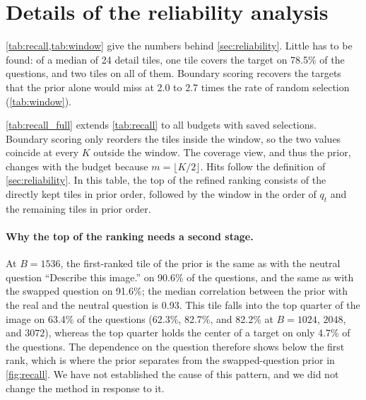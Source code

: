 \section{Details of the reliability analysis}
\label{sec:reliability_supp}





\cref{tab:recall,tab:window} give the numbers behind \cref{sec:reliability}. Little has to be found: of a median of
24 detail tiles, one tile covers the target on 78.5\% of the questions, and two tiles on all of them. Boundary scoring
recovers the targets that the prior alone would miss at 2.0 to 2.7 times the rate of random selection
(\cref{tab:window}).

\cref{tab:recall_full} extends \cref{tab:recall} to all budgets with saved selections. Boundary scoring only
reorders the tiles inside the window, so the two values coincide at every $K$ outside the window. The coverage
view, and thus the prior, changes with the budget because $m=\lfloor K/2\rfloor$. Hits follow the definition of
\cref{sec:reliability}. In this table, the top of the refined ranking consists of the directly kept tiles in
prior order, followed by the window in the order of $q_t$ and the remaining tiles in prior order.

\paragraph{Why the top of the ranking needs a second stage.}
At $B=1536$, the first-ranked tile of the prior is the same as with the neutral question ``Describe this
image.'' on 90.6\% of the questions, and the same as with the swapped question on 91.6\%; the median
correlation between the prior with the real and the neutral question is 0.93. This tile falls into the top
quarter of the image on 63.4\% of the questions (62.3\%, 82.7\%, and 82.2\% at $B=1024$, $2048$, and $3072$), whereas
the top quarter holds the center of a target on only 4.7\% of the questions. The dependence on the question
therefore shows below the first rank, which is where the prior separates from the swapped-question prior
in \cref{fig:recall}. We have not established the cause of this pattern, and we did not change the method in
response to it.

